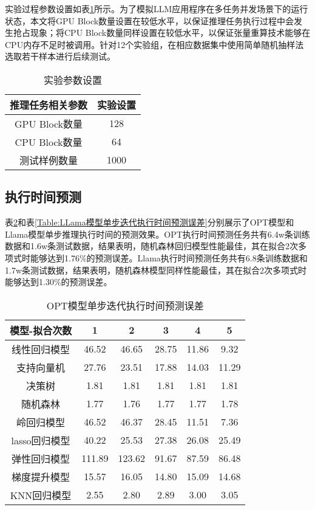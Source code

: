 实验过程参数设置如表\ref{Table:实验参数设置}所示。为了模拟LLM应用程序在多任务并发场景下的运行状态，本文将GPU Block数量设置在较低水平，以保证推理任务执行过程中会发生抢占现象；将CPU Block数量同样设置在较低水平，以保证张量重算技术能够在CPU内存不足时被调用。针对12个实验组，在相应数据集中使用简单随机抽样法选取若干样本进行后续测试。

\begin{table}[H]
  \centering
  \caption{实验参数设置}
  \label{Table:实验参数设置}
  \renewcommand{\arraystretch}{1.17}
  \small
  \begin{tabular}{c c}
    \toprule
    \textbf{推理任务相关参数} & \textbf{实验设置} \\
    \midrule
    GPU Block数量 & 128 \\ 
    CPU Block数量 & 64 \\ 
    测试样例数量 & 1000 \\ 
    \bottomrule
  \end{tabular}
\end{table}

\subsection{执行时间预测}
表\ref{Table:OPT模型单步迭代执行时间预测误差}和表\ref{Table:LLama模型单步迭代执行时间预测误差}分别展示了OPT模型和Llama模型单步推理执行时间的预测效果。OPT执行时间预测任务共有6.4w条训练数据和1.6w条测试数据，结果表明，随机森林回归模型性能最佳，其在拟合2次多项式时能够达到1.76\%的预测误差。Llama执行时间预测任务共有6.8条训练数据和1.7w条测试数据，结果表明，随机森林模型同样性能最佳，其在拟合2次多项式时能够达到1.30\%的预测误差。

\begin{table}[H]
  \centering
  \caption{OPT模型单步迭代执行时间预测误差}
  \label{Table:OPT模型单步迭代执行时间预测误差}
  \renewcommand{\arraystretch}{1.17}
  \small
  \begin{tabular}{c c c c c c}
    \toprule
    \textbf{模型-拟合次数} & \textbf{1} & \textbf{2} & \textbf{3} & \textbf{4} & \textbf{5} \\
    \midrule
    线性回归模型 & 46.52 & 46.65 & 28.75 & 11.86 & 9.32 \\ 
    支持向量机 & 27.76 & 23.51 & 17.88 & 14.03 & 11.29 \\
    决策树 & 1.81 & 1.81 & 1.81 & 1.81 & 1.81 \\ 
    随机森林 & 1.77 & 1.76 & 1.77 & 1.77 & 1.78 \\ 
    岭回归模型 & 46.52 & 46.37 & 28.45 & 11.51 & 7.36 \\ 
    lasso回归模型 & 40.22 & 25.53 & 27.38 & 26.08 & 25.49 \\ 
    弹性回归模型 & 111.89 & 123.62 & 91.67 & 87.59 & 86.48 \\ 
    梯度提升模型 & 15.57 & 16.05 & 14.80 & 15.09 & 14.68 \\ 
    KNN回归模型 & 2.55 & 2.80 & 2.89 & 3.00 & 3.05 \\ 
    \bottomrule
  \end{tabular}
\end{table}

